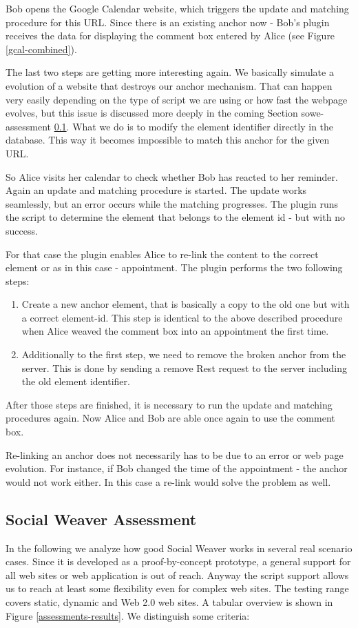 Bob opens the Google Calendar website, which triggers the update and matching procedure for this URL. Since there is an existing anchor now - Bob's plugin receives the data for displaying the comment box entered by Alice (see Figure \ref{gcal-combined}). 

The last two steps are getting more interesting again. We basically simulate a evolution of a website that destroys our anchor mechanism. That can happen very easily depending on the type of script we are using or how fast the webpage evolves, but this issue is discussed more deeply in the coming Section \refname{sowe-assessment} \ref{sowe-assessment}. What we do is to modify the element identifier directly in the database. This way it becomes impossible to match this anchor for the given URL. 

So Alice visits her calendar to check whether Bob has reacted to her reminder. Again an update and matching procedure is started. The update works seamlessly, but an error occurs while the matching progresses. The plugin runs the script to determine the element that belongs to the element id - but with no success. 

For that case the plugin enables Alice to re-link the content to the correct element or as in this case - appointment. The plugin performs the two following steps:
\begin{enumerate}
	\item Create a new anchor element, that is basically a copy to the old one but with a correct element-id. This step is identical to the above described procedure when Alice weaved the comment box into an appointment the first time. 
	\item  Additionally to the first step, we need to remove the broken anchor from the server. This is done by sending a remove Rest request to the server including the old element identifier. 
\end{enumerate} 
After those steps are finished, it is necessary to run the update and matching procedures again. Now Alice and Bob are able once again to use the comment box. 

Re-linking an anchor does not necessarily has to be due to an error or web page evolution. For instance, if Bob changed the time of the appointment - the anchor would not work either. In this case a re-link would solve the problem as well.

\newpage

\subsection{Social Weaver Assessment}\label{sowe-assessment}
In the following we analyze how good Social Weaver works in several real scenario cases. Since it is developed as a proof-by-concept prototype, a general support for all web sites or web application is out of reach. Anyway the script support allows us to reach at least some flexibility even for complex web sites. The testing range covers static, dynamic and Web 2.0 web sites. A tabular overview is shown in Figure \ref{assessments-results}. We distinguish some criteria:


